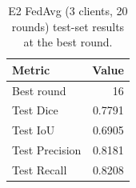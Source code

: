 \begin{table}[t]
\centering
\begin{tabular}{lr}
\toprule
Metric & Value \\
\midrule
Best round & 16 \\
Test Dice & 0.7791 \\
Test IoU & 0.6905 \\
Test Precision & 0.8181 \\
Test Recall & 0.8208 \\
\bottomrule
\end{tabular}
\caption{E2 FedAvg (3 clients, 20 rounds) test-set results at the best round.}
\label{tab:e2-fedavg}
\end{table}